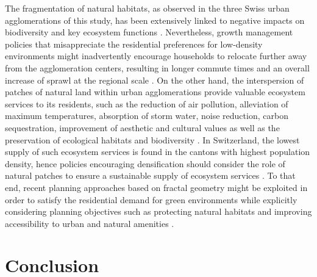 \documentclass[10pt,letterpaper]{article}
\begin{document}
The fragmentation of natural habitats, as observed in the three Swiss urban agglomerations of this study, has been extensively linked to negative impacts on biodiversity and key ecosystem functions \cite{haddad2015habitat}.
Nevertheless, growth management policies that misappreciate the residential preferences for low-density environments might inadvertently encourage households to relocate further away from the agglomeration centers, resulting in longer commute times and an overall increase of sprawl at the regional scale \cite{schwanen2004policies, robinson2005twenty}.
On the other hand, the interspersion of patches of natural land within urban agglomerations provide valuable ecosystem services to its residents, such as the reduction of air pollution, alleviation of maximum temperatures, absorption of storm water, noise reduction, carbon sequestration, improvement of aesthetic and cultural values as well as the preservation of ecological habitats and biodiversity \cite{bolund1999ecosystem, gomez2013classifying}.
In Switzerland, the lowest supply of such ecosystem services is found in the cantons with highest population density, hence policies encouraging densification should consider the role of natural patches to ensure a sustainable supply of ecosystem services \cite{jaligot2019historical}.
To that end, recent planning approaches based on fractal geometry \cite{yamu2015spatial} might be exploited in order to satisfy the residential demand for green environments while explicitly considering planning objectives such as protecting natural habitats and improving accessibility to urban and natural amenities \cite{bosch2019addressing}.

\section*{Conclusion}
\end{document}

